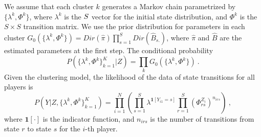 We assume that each cluster $k$ generates a Markov chain parametrized by $\{\lambda^k, \Phi^k\}$, 
where $\lambda^k$ is the $S\time 1$ vector for the initial state distribution, 
and $\Phi^k$ is the $S \times S$ transition matrix. We use the prior distribution 
for parameters in each cluster $G_0(\{\lambda^k, \Phi^k\}) = Dir(\hat\pi) \prod_{s=1}^S Dir (\hat B_{s.})$,
where $\hat\pi$ and $\hat B$ are the estimated parameters at the first step. 
The conditional probability  
\begin{equation}
\label{eq:condi}
  P(\{\lambda^k, \Phi^k \}_{k=1}^K | Z ) 
= \prod_k G_0(\{\lambda^k, \Phi^k\})~.
\end{equation}
Given the clustering model, the likelihood of the data of state transitions for all players is
\begin{equation}
\label{eq:likeli}
  P(Y| Z, \{\lambda^k, \Phi^k \}_{k=1}^K) 
= \prod_{i=1}^N \left( \prod_{s=1}^S \lambda^{\mathbf{1}[Y_{i1} = s]} \prod_{r=1}^S \left(\Phi_{rs}^{Z_i}\right)^{n_{irs}} \right)~,
\end{equation}
where $\mathbf{1} [\cdot]$ is the indicator function, and $n_{irs}$ is the number of transitions from state $r$ to state $s$ for the $i$-th player.

